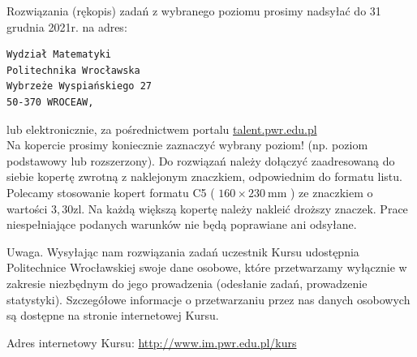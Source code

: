 \documentclass[10pt]{article}
\begin{document}
Rozwiązania (rękopis) zadań z wybranego poziomu prosimy nadsyłać do 31 grudnia 2021r. na adres:

\begin{verbatim}
Wydział Matematyki
Politechnika Wrocławska
Wybrzeże Wyspiańskiego 27
50-370 WROCEAW,
\end{verbatim}

lub elektronicznie, za pośrednictwem portalu \href{http://talent.pwr.edu.pl}{talent.pwr.edu.pl}\\
Na kopercie prosimy koniecznie zaznaczyć wybrany poziom! (np. poziom podstawowy lub rozszerzony). Do rozwiązań należy dołączyć zaadresowaną do siebie kopertę zwrotną z naklejonym znaczkiem, odpowiednim do formatu listu. Polecamy stosowanie kopert formatu C5 ( $160 \times 230 \mathrm{~mm}$ ) ze znaczkiem o wartości $3,30 \mathrm{zl}$. Na każdą większą kopertę należy nakleić droższy znaczek. Prace niespełniające podanych warunków nie będą poprawiane ani odsyłane.

Uwaga. Wysyłając nam rozwiązania zadań uczestnik Kursu udostępnia Politechnice Wrocławskiej swoje dane osobowe, które przetwarzamy wyłącznie w zakresie niezbędnym do jego prowadzenia (odesłanie zadań, prowadzenie statystyki). Szczegółowe informacje o przetwarzaniu przez nas danych osobowych są dostępne na stronie internetowej Kursu.

Adres internetowy Kursu: \href{http://www.im.pwr.edu.pl/kurs}{http://www.im.pwr.edu.pl/kurs}
\end{document}
